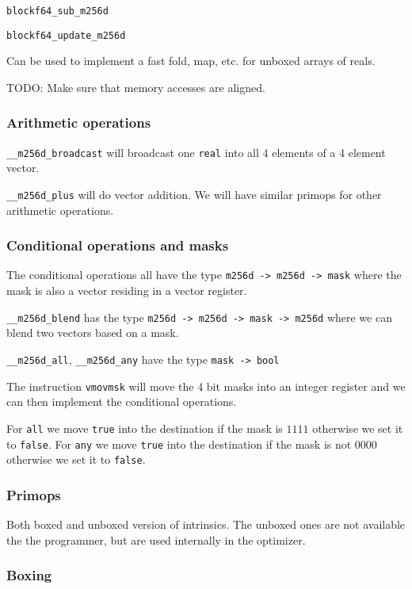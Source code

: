 \documentclass{article}
\begin{document}
\verb!blockf64_sub_m256d!

\verb!blockf64_update_m256d!

Can be used to implement a fast fold, map, etc. for unboxed arrays of reals.


TODO: Make sure that memory accesses are aligned.

\subsubsection{Arithmetic operations}

\verb!__m256d_broadcast! will broadcast one \verb!real! into all 4 elements of a 4 element vector.

\verb!__m256d_plus! will do vector addition. We will have similar primops for other arithmetic operations.

\subsubsection{Conditional operations and masks}

The conditional operations all have the type \verb!m256d -> m256d -> mask! where the mask is also a vector residing in a vector register.

\verb!__m256d_blend! has the type \verb!m256d -> m256d -> mask -> m256d! where we can blend two vectors based on a mask.

\verb!__m256d_all!, \verb!__m256d_any! have the type \verb!mask -> bool!

The instruction \verb!vmovmsk! will move the 4 bit masks into an integer register and we can then implement the conditional operations.

For \verb!all! we move \verb!true! into the destination if the mask is $1111$ otherwise we set it to \verb!false!.
For \verb!any! we move \verb!true! into the destination if the mask is not $0000$ otherwise we set it to \verb!false!.

\subsubsection{Primops}

Both boxed and unboxed version of intrinsics. The unboxed ones are not available the the programmer, but are used internally in the optimizer.

\subsubsection{Boxing}
\end{document}
